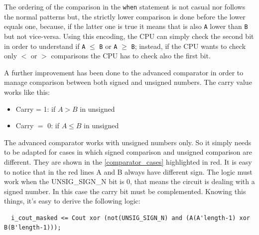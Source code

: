 The ordering of the comparison in the \texttt{when} statement is not casual nor follows the normal patterns but, the strictly lower comparison is done before the lower equals one, because, if the latter one is true it means that is also \texttt{A} lower than \texttt{B} but not vice-versa. Using this encoding, the CPU can simply check the second bit in order to understand if \texttt{A} $\leq$ \texttt{B} or \texttt{A} $\geq$ \texttt{B}; instead, if the CPU wants to check only $<$ or $>$ comparisons the CPU has to check also the first bit.

 

A further improvement has been done to the advanced comparator in order to manage comparison between both signed and unsigned numbers. The carry value works like this:
\begin{itemize}
  \item Carry = 1: if \(A > B\) in unsigned
  \item Carry \(=\) 0: if \(A \leq B\) in unsigned
\end{itemize}

The advanced comparator works with unsigned numbers only. So it simply needs to be adapted for cases in which signed comparison and unsigned comparison are different. They are shown in the \autoref{comparator_cases} highlighted in red. 
It is easy to notice that in the red lines A and B always have different sign. The logic must work when the UNSIG\_SIGN\_N bit is 0, that means the circuit is dealing with a signed number. In this case the carry bit must be complemented. Knowing this things, it's easy to derive the following logic:

\begin{verbatim}
  i_cout_masked <= Cout xor (not(UNSIG_SIGN_N) and (A(A'length-1) xor B(B'length-1)));
\end{verbatim}

